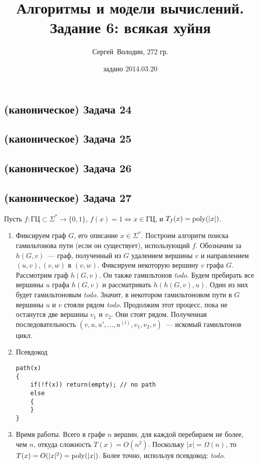 \documentclass[a4paper]{article}
\date{задано 2014.03.20}
\author{Сергей~Володин, 272 гр.}
\title{Алгоритмы и модели вычислений.\\Задание 6: всякая хуйня}
\def\poly{{\rm{poly}}}
\def\GC{{\mbox{ГЦ}}}
\newcommand{\todo}{{\em todo}}
\begin{document}
\maketitle
\subsection*{(каноническое) Задача 24}
\subsection*{(каноническое) Задача 25}
\subsection*{(каноническое) Задача 26}
\subsection*{(каноническое) Задача 27}
Пусть $f\colon \GC\subset\Sigma^*\to\{0,1\}$, $f(x)=1\Leftrightarrow x\in\GC$, и $T_f(x)=\poly(|x|)$.
\begin{enumerate}
\item Фиксируем граф $G$, его описание $x\in\Sigma^*$. Построим алгоритм поиска гамильтонова пути (если он существует), использующий $f$. Обозначим за $h(G, v)$~--- граф, полученный из $G$ удалением вершины $v$ и направлением $(u,v), (v, w)$ в $(v, w)$. Фиксируем некоторую вершину $v$ графа $G$. Рассмотрим граф $h(G,v)$. Он также гамильтонов \todo. Будем пребирать все вершины $u$ графа $h(G,v)$ и рассматривать $h(h(G,v),u)$. Один из них будет гамильтоновым \todo. Значит, в некотором гамильтоновом пути в $G$ вершины $u$ и $v$ стояли рядом \todo. Продолжим этот процесс, пока не останутся две вершины $v_1$ и $v_2$. Они стоят рядом. Полученная последовательность $(v,u,u',...,u^{(l)},v_1,v_2,v)$~--- искомый гамильтонов цикл.
\item Псевдокод
\begin{lstlisting}
path(x)
{
    if(!f(x)) return(empty); // no path
    else
    {
    }
}
\end{lstlisting}
\item Время работы. Всего в графе $n$ вершин, для каждой перебираем не более, чем $n$, откуда сложность $T(x)=O(n^2)$. Поскольку $|x|=\Omega(n)$, то $T(x)=O(|x|^2)=\poly(|x|)$. Более точно, используя псевдокод: \todo.
\end{enumerate}
\end{document}
